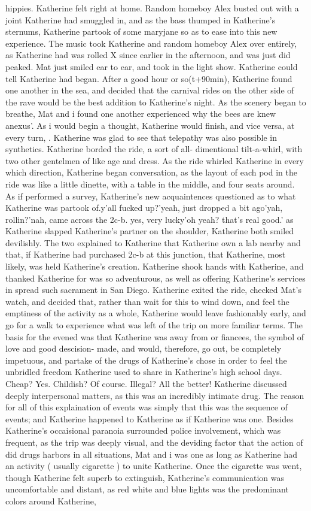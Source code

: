 \documentclass[12pt]{book}
\begin{document}
hippies. Katherine felt right at home. Random homeboy Alex busted out with a joint Katherine had smuggled in, and as the bass thumped in Katherine's sternums, Katherine partook of some maryjane so as to ease into this new experience. The music took Katherine and random homeboy Alex over entirely, as Katherine had was rolled X since earlier in the afternoon, and was just did peaked. Mat just smiled ear to ear, and took in the light show. Katherine could tell Katherine had began. After a good hour or so(t+90min), Katherine found one another in the sea, and decided that the carnival rides on the other side of the rave would be the best addition to Katherine's night. As the scenery began to breathe, Mat and i found one another experienced why the bees are knew anexus'. As i would begin a thought, Katherine would finish, and vice versa, at every turn, . Katherine was glad to see that telepathy was also possible in synthetics. Katherine borded the ride, a sort of all- dimentional tilt-a-whirl, with two other gentelmen of like age and dress. As the ride whirled Katherine in every which direction, Katherine began conversation, as the layout of each pod in the ride was like a little dinette, with a table in the middle, and four seats around. As if performed a survey, Katherine's new acquaintences questioned as to what Katherine was partook of.y'all fucked up?'yeah, just dropped a bit ago'yah, rollin?'nah, came across the 2c-b. yes, very lucky'oh yeah? that's real good.' as Katherine slapped Katherine's partner on the shoulder, Katherine both smiled devilishly. The two explained to Katherine that Katherine own a lab nearby and that, if Katherine had purchased 2c-b at this junction, that Katherine, most likely, was held Katherine's creation. Katherine shook hands with Katherine, and thanked Katherine for was so adventurous, as well as offering Katherine's services in spread such sacrament in San Diego. Katherine exited the ride, checked Mat's watch, and decided that, rather than wait for this to wind down, and feel the emptiness of the activity as a whole, Katherine would leave fashionably early, and go for a walk to experience what was left of the trip on more familiar terms. The basis for the evened was that Katherine was away from or fiancees, the symbol of love and good descision- made, and would, therefore, go out, be completely impetuous, and partake of the drugs of Katherine's chose in order to feel the unbridled freedom Katherine used to share in Katherine's high school days. Cheap? Yes. Childish? Of course. Illegal? All the better! Katherine discussed deeply interpersonal matters, as this was an incredibly intimate drug. The reason for all of this explaination of events was simply that this was the sequence of events; and Katherine happened to Katherine as if Katherine was one. Besides Katherine's occaisional paranoia surrounded police involvement, which was frequent, as the trip was deeply visual, and the deviding factor that the action of did drugs harbors in all situations, Mat and i was one as long as Katherine had an activity ( usually cigarette ) to unite Katherine. Once the cigarette was went, though Katherine felt superb to extinguish, Katherine's communication was uncomfortable and distant, as red white and blue lights was the predominant colors around Katherine, 
\end{document}
